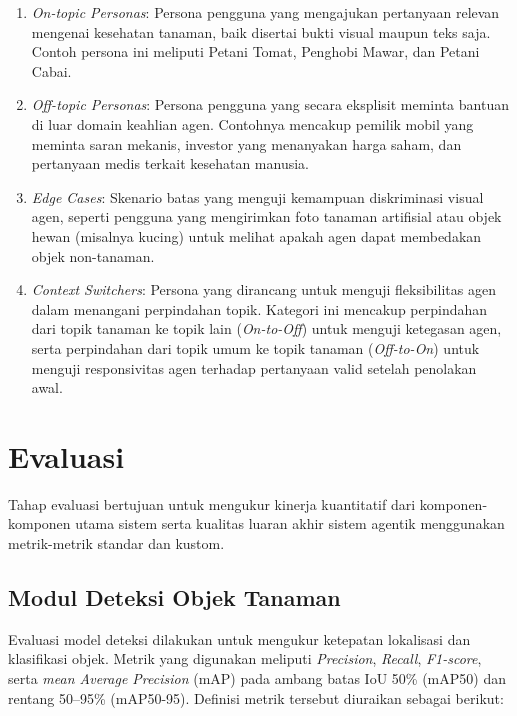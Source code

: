 \begin{enumerate}[nosep]
    \item \textit{On-topic Personas}: Persona pengguna yang mengajukan pertanyaan relevan mengenai kesehatan tanaman, baik disertai bukti visual maupun teks saja. Contoh persona ini meliputi Petani Tomat, Penghobi Mawar, dan Petani Cabai.
    \item \textit{Off-topic Personas}: Persona pengguna yang secara eksplisit meminta bantuan di luar domain keahlian agen. Contohnya mencakup pemilik mobil yang meminta saran mekanis, investor yang menanyakan harga saham, dan pertanyaan medis terkait kesehatan manusia.
    \item \textit{Edge Cases}: Skenario batas yang menguji kemampuan diskriminasi visual agen, seperti pengguna yang mengirimkan foto tanaman artifisial atau objek hewan (misalnya kucing) untuk melihat apakah agen dapat membedakan objek non-tanaman.
    \item \textit{Context Switchers}: Persona yang dirancang untuk menguji fleksibilitas agen dalam menangani perpindahan topik. Kategori ini mencakup perpindahan dari topik tanaman ke topik lain (\textit{On-to-Off}) untuk menguji ketegasan agen, serta perpindahan dari topik umum ke topik tanaman (\textit{Off-to-On}) untuk menguji responsivitas agen terhadap pertanyaan valid setelah penolakan awal.
\end{enumerate}

\section{Evaluasi}
Tahap evaluasi bertujuan untuk mengukur kinerja kuantitatif dari komponen-komponen utama sistem serta kualitas luaran akhir sistem agentik menggunakan metrik-metrik standar dan kustom.

\subsection{Modul Deteksi Objek Tanaman}
Evaluasi model deteksi dilakukan untuk mengukur ketepatan lokalisasi dan klasifikasi objek. Metrik yang digunakan meliputi \textit{Precision}, \textit{Recall}, \textit{F1-score}, serta \textit{mean Average Precision} (mAP) pada ambang batas IoU 50\% (mAP50) dan rentang 50--95\% (mAP50-95). Definisi metrik tersebut diuraikan sebagai berikut:

